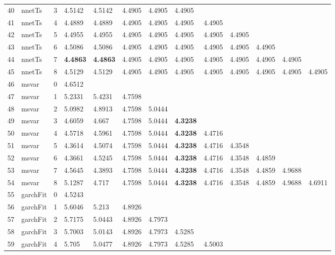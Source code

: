 \documentclass[10pt,a4paper]{article}
\begin{document}
\begin{table}[ht]
\begin{tabular}{rlrllllllllll}
  40 & nnetTs &     3 & 4.5142 & 4.5142 & 4.4905 & 4.4905 & 4.4905 &  &  &  &  &  \\ 
  41 & nnetTs &     4 & 4.4889 & 4.4889 & 4.4905 & 4.4905 & 4.4905 & 4.4905 &  &  &  &  \\ 
  42 & nnetTs &     5 & 4.4955 & 4.4955 & 4.4905 & 4.4905 & 4.4905 & 4.4905 & 4.4905 &  &  &  \\ 
  43 & nnetTs &     6 & 4.5086 & 4.5086 & 4.4905 & 4.4905 & 4.4905 & 4.4905 & 4.4905 & 4.4905 &  &  \\ 
  44 & nnetTs &     7 & \textbf{4.4863} & \textbf{4.4863} & 4.4905 & 4.4905 & 4.4905 & 4.4905 & 4.4905 & 4.4905 & 4.4905 &  \\ 
  45 & nnetTs &     8 & 4.5129 & 4.5129 & 4.4905 & 4.4905 & 4.4905 & 4.4905 & 4.4905 & 4.4905 & 4.4905 & 4.4905 \\ 
   \hline
46 & msvar &     0 & 4.6512 &  &  &  &  &  &  &  &  &  \\ 
  47 & msvar &     1 & 5.2331 & 5.4231 & 4.7598 &  &  &  &  &  &  &  \\ 
  48 & msvar &     2 & 5.0982 & 4.8913 & 4.7598 & 5.0444 &  &  &  &  &  &  \\ 
  49 & msvar &     3 & 4.6059 & 4.667 & 4.7598 & 5.0444 & \textbf{4.3238} &  &  &  &  &  \\ 
  50 & msvar &     4 & 4.5718 & 4.5961 & 4.7598 & 5.0444 & \textbf{4.3238} & 4.4716 &  &  &  &  \\ 
  51 & msvar &     5 & 4.3614 & 4.5074 & 4.7598 & 5.0444 & \textbf{4.3238} & 4.4716 & 4.3548 &  &  &  \\ 
  52 & msvar &     6 & 4.3661 & 4.5245 & 4.7598 & 5.0444 & \textbf{4.3238} & 4.4716 & 4.3548 & 4.4859 &  &  \\ 
  53 & msvar &     7 & 4.5645 & 4.3893 & 4.7598 & 5.0444 & \textbf{4.3238} & 4.4716 & 4.3548 & 4.4859 & 4.9688 &  \\ 
  54 & msvar &     8 & 5.1287 & 4.717 & 4.7598 & 5.0444 & \textbf{4.3238} & 4.4716 & 4.3548 & 4.4859 & 4.9688 & 4.6911 \\ 
   \hline
55 & garchFit &     0 & 4.5243 &  &  &  &  &  &  &  &  &  \\ 
  56 & garchFit &     1 & 5.6046 & 5.213 & 4.8926 &  &  &  &  &  &  &  \\ 
  57 & garchFit &     2 & 5.7175 & 5.0443 & 4.8926 & 4.7973 &  &  &  &  &  &  \\ 
  58 & garchFit &     3 & 5.7003 & 5.0143 & 4.8926 & 4.7973 & 4.5285 &  &  &  &  &  \\ 
  59 & garchFit &     4 & 5.705 & 5.0477 & 4.8926 & 4.7973 & 4.5285 & 4.5003 &  &  &  &  \\ 

\end{tabular}
\end{table}
\end{document}

